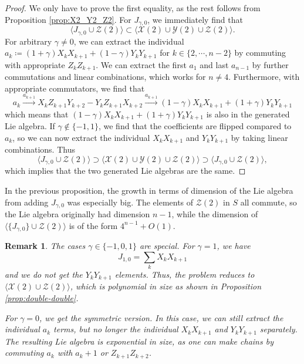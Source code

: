 \documentclass[12pt, a4-paper]{amsart}
\newcommand{\cX}{\mathcal{X}}
\newcommand{\cY}{\mathcal{Y}}
\newcommand{\cZ}{\mathcal{Z}}
\numberwithin{equation}{section}
\newtheorem{rem}[lemma]{Remark}
\begin{document}
\begin{proof}
    We only have to prove the first equality, as the rest follows from Proposition \ref{prop:X2_Y2_Z2}. For $J_{\gamma,0}$, we immediately find that 
    \begin{equation}
        \langle J_{\gamma,0} \cup \cZ(2) \rangle \subset \langle \cX(2) \cup \cY(2) \cup \cZ(2) \rangle.
    \end{equation}
    For arbitrary $\gamma \neq 0$, we can extract the individual $a_k \coloneqq (1+\gamma) X_k X_{k+1} + (1-\gamma) Y_k Y_{k+1}$ for $k \in \{2, \cdots, n-2\}$ by commuting with appropriate $Z_k Z_{k+1}$. We can extract the first $a_1$ and last $a_{n-1}$ by further commutations and linear combinations, which works for $n \neq 4$. Furthermore, with appropriate commutators, we find that
    \begin{equation}
        a_k \stackrel{a_{k+1}}{\longrightarrow} X_k Z_{k+1} Y_{k+2} - Y_k Z_{k+1} X_{k+2} \stackrel{a_{k+1}}{\longrightarrow} (1-\gamma) X_k X_{k+1} + (1+\gamma) Y_k Y_{k+1} 
    \end{equation}
    which means that $(1-\gamma) X_k X_{k+1} +(1+\gamma) Y_k Y_{k+1}$ is also in the generated Lie algebra. If $\gamma \notin \{-1,1\}$, we find that the coefficients are flipped compared to $a_k$, so we can now extract the individual $X_k X_{k+1}$ and $Y_k Y_{k+1}$ by taking linear combinations. Thus
    \begin{equation}
        \langle J_{\gamma,0} \cup \cZ(2) \rangle \supset \langle \cX(2) \cup \cY(2) \cup \cZ(2) \rangle \supset \langle J_{\gamma, 0} \cup \cZ(2) \rangle,
    \end{equation}
    which implies that the two generated Lie algebras are the same.
\end{proof}

In the previous proposition, the growth in terms of dimension of the Lie algebra from adding $J_{\gamma,0}$ was especially big. The elements of $\cZ(2)$ in $S$ all commute, so the Lie algebra originally had dimension $n-1$, while the dimension of $\langle \{J_{\gamma,0} \} \cup \cZ(2) \rangle$ is of the form $4^{n-1}+O(1)$.

\begin{rem}\label{rem:J_Z2_symmetry}
    The cases $\gamma \in \{-1,0,1\}$ are special. For $\gamma = 1$, we have
    \begin{equation}
        J_{1,0} = \sum_k X_k X_{k+1}
    \end{equation}
    and we do not get the $Y_k Y_{k+1}$ elements. Thus, the problem reduces to $\langle \cX(2) \cup \cZ(2) \rangle$, which is polynomial in size as shown in Proposition  \ref{prop:double-double}.

    For $\gamma = 0$, we get the symmetric version. In this case, we can still extract the individual $a_k$ terms, but no longer the individual $X_k X_{k+1}$ and $Y_k Y_{k+1}$ separately. The resulting Lie algebra is exponential in size, as one can make chains by commuting $a_k$ with $a_k+1$ or $Z_{k+1}Z_{k+2}$.
\end{rem}
\end{document}
